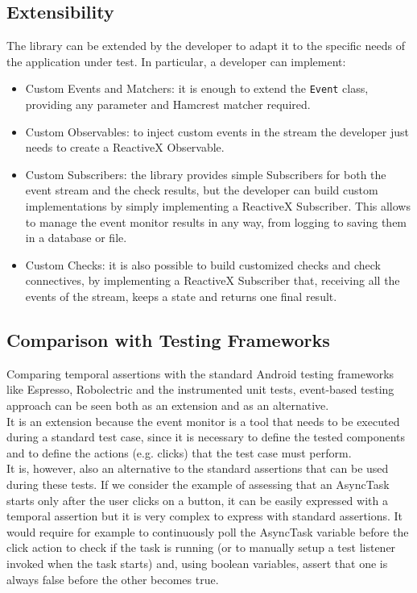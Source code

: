 \documentclass[11pt,a4paper,notitlepage]{article}
\begin{document}
{\subsection{Extensibility}
The library can be extended by the developer to adapt it to the specific needs of the application under test. In particular, a developer can implement:
\begin{itemize}
	\item Custom Events and Matchers: it is enough to extend the \texttt{Event} class, providing any parameter and Hamcrest matcher required.
	\item Custom Observables: to inject custom events in the stream the developer just needs to create a ReactiveX Observable.
	\item Custom Subscribers: the library provides simple Subscribers for both the event stream and the check results, but the developer can build custom implementations by simply implementing a ReactiveX Subscriber. This allows to manage the event monitor results in any way, from logging to saving them in a database or file.
	\item Custom Checks: it is also possible to build customized checks and check connectives, by implementing a ReactiveX Subscriber that, receiving all the events of the stream, keeps a state and returns one final result.
\end{itemize}

\subsection{Comparison with Testing Frameworks}
Comparing temporal assertions with the standard Android testing frameworks like Espresso, Robolectric and the instrumented unit tests, event-based testing approach can be seen both as an extension and as an alternative.\medskip \\
It is an extension because the event monitor is a tool that needs to be executed during a standard test case, since it is necessary to define the tested components and to define the actions (e.g. clicks) that the test case must perform.\medskip \\
It is, however, also an alternative to the standard assertions that can be used during these tests. If we consider the example of assessing that an AsyncTask starts only after the user clicks on a button, it can be easily expressed with a temporal assertion but it is very complex to express with standard assertions. It would require for example to continuously poll the AsyncTask variable before the click action to check if the task is running (or to manually setup a test listener invoked when the task starts) and, using boolean variables, assert that one is always false before the other becomes true.

}
\end{document}
